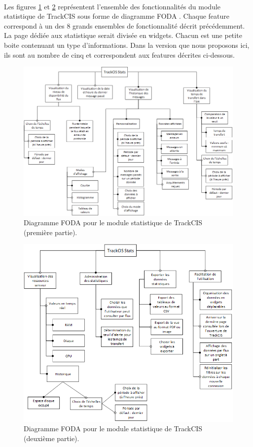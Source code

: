 			\paragraph{}
			Les figures \ref{foda_1} et \ref{foda_2} représentent l'ensemble des
			fonctionnalités du module statistique de TrackCIS sous forme de diagramme
			FODA . Chaque feature correspond à un des 8 grands
			ensembles de fonctionnalité décrit précédemment.\newline
			La page dédiée aux statistique serait divisée en widgets. Chacun est une
			petite boite contenuant un type d'informations. Dans la version que nous
			proposons ici, ils sont au nombre de cinq et correspondent aux features
			décrites ci-dessous.
			\begin{figure}%
				\centering
				\includegraphics[width=17cm]{../img/part2/foda_1.png}
				\caption{\label{foda_1} Diagramme FODA pour le module statistique de
				TrackCIS (première partie).}
			\end{figure}
			\begin{figure}%
				\centering
				\includegraphics[width=17cm]{../img/part2/foda_2.png}
				\caption{\label{foda_2} Diagramme FODA pour le module statistique de
				TrackCIS (deuxième partie).}
			\end{figure}
			
